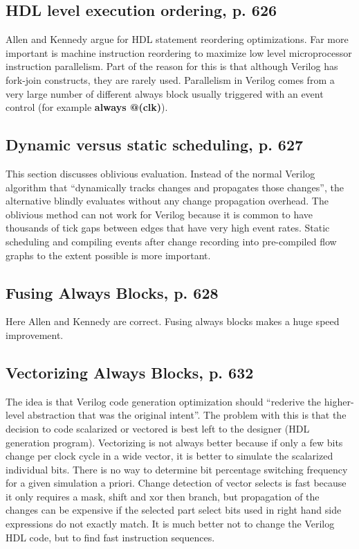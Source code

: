 \documentclass[preprint, authoryear]{sigplanconf}
\begin{document}
\subsection{HDL level execution ordering, p. 626}
\par
Allen and Kennedy argue for HDL statement reordering optimizations.
Far more important is machine instruction reordering to maximize low
level microprocessor instruction parallelism.
Part of the reason for this is that although
Verilog has fork-join constructs, they are rarely used.  Parallelism
in Verilog comes from a very large number of different always block usually
triggered with an event control (for example \textbf{always @(clk)}).
\subsection{Dynamic versus static scheduling, p. 627}
\par
This section discusses oblivious evaluation.  Instead of the normal
Verilog algorithm that ``dynamically tracks changes and propagates
those changes'', the alternative blindly evaluates without any
change propagation overhead.  The oblivious method can not work
for Verilog because it is common to have thousands of tick gaps between
edges that have very high event rates.  Static scheduling
and compiling events after change recording into pre-compiled
flow graphs to the extent possible is more important.
\subsection{Fusing Always Blocks, p. 628}
\par
Here Allen and Kennedy are correct.  Fusing always blocks makes a huge
speed improvement.
\subsection{Vectorizing Always Blocks, p. 632}
\par
The idea is that Verilog code generation optimization
should ``rederive the higher-level abstraction that was the original
intent''.  The problem with this is that the decision to code scalarized
or vectored is best left to the designer (HDL generation program).
Vectorizing is not always better because if
only a few bits change per clock cycle
in a wide vector, it is better to simulate the scalarized individual bits.
There is no way to determine bit percentage switching frequency
for a given simulation a priori.  Change detection of vector
selects is fast because
it only requires a mask, shift and xor then branch, but propagation of
the changes can be expensive if the selected part select bits used in right
hand side expressions do not exactly match.  It is much better not
to change the Verilog HDL code, but to find fast instruction sequences.
\end{document}
